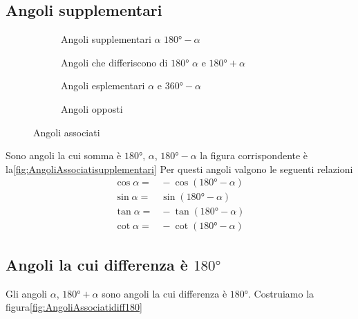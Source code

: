 \subsection{Angoli supplementari}
\begin{figure}
	\centering
	\begin{subfigure}[b]{.48\linewidth}
	\centering
	\caption{Angoli supplementari $\alpha$ $\ang{180}-\alpha$}\label{fig:AngoliAssociatisupplementari}		
   \end{subfigure}
 \begin{subfigure}[b]{.48\linewidth}
 	\centering
 	
 	\caption{Angoli che differiscono di $\ang{180}$ $\alpha$ e $\ang{180}+\alpha$}
 	\label{fig:AngoliAssociatidiff180}	
 \end{subfigure}
 	\begin{subfigure}[b]{.49\linewidth}
 		\centering
 		
 		\caption{Angoli esplementari $\alpha$ e $\ang{360}-\alpha$}\label{fig:Angolidif360}
 	\end{subfigure}
 	\begin{subfigure}[b]{.49\linewidth}
 		\centering
 		
 		\caption{Angoli opposti}\label{fig:angoliopposti}
 	\end{subfigure}
\caption{Angoli associati}
	\label{fig:angoliassociatii}
\end{figure}
Sono angoli la cui somma è $\ang{180}$, $\alpha$, $\ang{180}-\alpha$ la figura corrispondente è la\nobs\vref{fig:AngoliAssociatisupplementari}
Per questi angoli valgono le seguenti relazioni
\begin{align*}
\cos\alpha=&{}-\cos(\ang{180}-\alpha)\\
\sin\alpha=&{}\sin(\ang{180}-\alpha)\\
\tan\alpha=&{}-\tan(\ang{180}-\alpha)\\
\cot\alpha=&{}-\cot(\ang{180}-\alpha)
\end{align*}
\subsection{Angoli la cui differenza è $\ang{180}$}
\label{sub:Dif180}
Gli angoli $\alpha$, $\ang{180}+\alpha$ sono angoli la cui differenza è $\ang{180}$.  Costruiamo la figura\nobs\vref{fig:AngoliAssociatidiff180}

